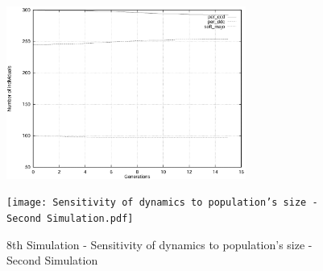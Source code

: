	\begin{figure}[h]
	    \centering
		\includegraphics[width=0.7\textwidth]{RefPaperFigures/fig7b.jpeg}\par\vspace{0.5em}
	    \texttt{[image: Sensitivity of dynamics to population's size - Second Simulation.pdf]}
	    \caption{8th Simulation - Sensitivity of dynamics to population's size - Second Simulation}
	    \label{fig:Sensitivity of dynamics to population's size - Second Simulation}
	\end{figure}
